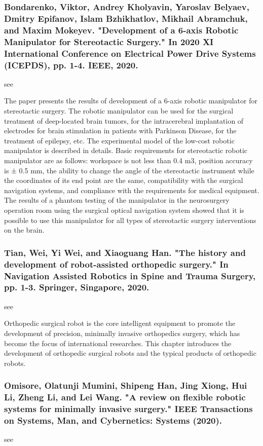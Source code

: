 \documentclass[conference]{IEEEtran}
\begin{document}
\medskip
\subsubsection{Bondarenko, Viktor, Andrey Kholyavin, Yaroslav Belyaev, Dmitry Epifanov, Islam Bzhikhatlov, Mikhail Abramchuk, and Maxim Mokeyev. "Development of a 6-axis Robotic Manipulator for Stereotactic Surgery." In 2020 XI International Conference on Electrical Power Drive Systems (ICEPDS), pp. 1-4. IEEE, 2020.}
see \cite{bondarenko2020development}

The paper presents the results of development of a 6-axis robotic manipulator for stereotactic surgery. The robotic manipulator can be used for the surgical treatment of deep-located brain tumors, for the intracerebral implantation of electrodes for brain stimulation in patients with Parkinson Disease, for the treatment of epilepsy, etc. The experimental model of the low-cost robotic manipulator is described in details. Basic requirements for stereotactic robotic manipulator are as follows: workspace is not less than 0.4 m3, position accuracy is ± 0.5 mm, the ability to change the angle of the stereotactic instrument while the coordinates of its end point are the same, compatibility with the surgical navigation systems, and compliance with the requirements for medical equipment. The results of a phantom testing of the manipulator in the neurosurgery operation room using the surgical optical navigation system showed that it is possible to use this manipulator for all types of stereotactic surgery interventions on the brain.

\medskip
\subsubsection{Tian, Wei, Yi Wei, and Xiaoguang Han. "The history and development of robot-assisted orthopedic surgery." In Navigation Assisted Robotics in Spine and Trauma Surgery, pp. 1-3. Springer, Singapore, 2020.}
see \cite{tian2020history}

Orthopedic surgical robot is the core intelligent equipment to promote the development of precision, minimally invasive orthopedics surgery, which has become the focus of international researches. This chapter introduces the development of orthopedic surgical robots and the typical products of orthopedic robots.

\medskip
\subsubsection{Omisore, Olatunji Mumini, Shipeng Han, Jing Xiong, Hui Li, Zheng Li, and Lei Wang. "A review on flexible robotic systems for minimally invasive surgery." IEEE Transactions on Systems, Man, and Cybernetics: Systems (2020).}
see \cite{omisore2020review}
\end{document}
